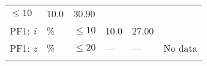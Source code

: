 \documentclass[DM,toc]{lsstdoc}
\begin{document}
\begin{longtable}[]{@{}llllll@{}}
\begin{minipage}[t]{0.17\columnwidth}
\(\leq 10\)\strut
\end{minipage} & \begin{minipage}[t]{0.17\columnwidth}\raggedright\strut
10.0\strut
\end{minipage} & \begin{minipage}[t]{0.12\columnwidth}\raggedright\strut
30.90\strut
\end{minipage} & \begin{minipage}[t]{0.17\columnwidth}\raggedright\strut
\strut
\end{minipage}\tabularnewline
\begin{minipage}[t]{0.14\columnwidth}\raggedright\strut
PF1: \emph{i}\strut
\end{minipage} & \begin{minipage}[t]{0.06\columnwidth}\raggedright\strut
\%\strut
\end{minipage} & \begin{minipage}[t]{0.17\columnwidth}\raggedright\strut
\(\leq 10\)\strut
\end{minipage} & \begin{minipage}[t]{0.17\columnwidth}\raggedright\strut
10.0\strut
\end{minipage} & \begin{minipage}[t]{0.12\columnwidth}\raggedright\strut
27.00\strut
\end{minipage} & \begin{minipage}[t]{0.17\columnwidth}\raggedright\strut
\strut
\end{minipage}\tabularnewline
\begin{minipage}[t]{0.14\columnwidth}\raggedright\strut
PF1: \emph{z}\strut
\end{minipage} & \begin{minipage}[t]{0.06\columnwidth}\raggedright\strut
\%\strut
\end{minipage} & \begin{minipage}[t]{0.17\columnwidth}\raggedright\strut
\(\leq 20\)\strut
\end{minipage} & \begin{minipage}[t]{0.17\columnwidth}\raggedright\strut
---\strut
\end{minipage} & \begin{minipage}[t]{0.12\columnwidth}\raggedright\strut
---\strut
\end{minipage} & \begin{minipage}[t]{0.17\columnwidth}\raggedright\strut
No data\strut
\end{minipage}\tabularnewline
\begin{minipage}[t]{0.14\columnwidth}\raggedright\strut

\end{minipage}
\end{longtable}
\end{document}
